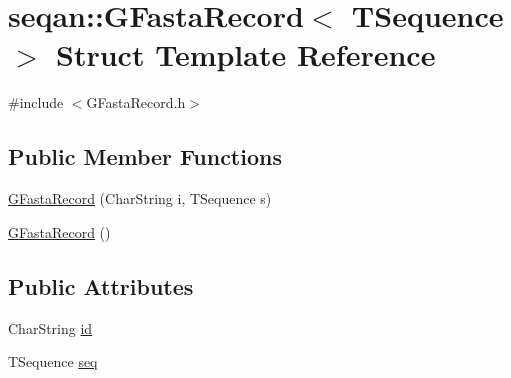 \hypertarget{structseqan_1_1_g_fasta_record}{\section{seqan\-:\-:G\-Fasta\-Record$<$ T\-Sequence $>$ Struct Template Reference}
\label{structseqan_1_1_g_fasta_record}
}


{\ttfamily \#include $<$G\-Fasta\-Record.\-h$>$}

\subsection*{Public Member Functions}
\begin{DoxyCompactItemize}
\item 
\hyperlink{structseqan_1_1_g_fasta_record_aab6a24e2129b61ff86d56bc2b6b9e9a3}{G\-Fasta\-Record} (Char\-String i, T\-Sequence s)
\item 
\hyperlink{structseqan_1_1_g_fasta_record_a605409d17ae67a8bd374d135bc6a3cc4}{G\-Fasta\-Record} ()
\end{DoxyCompactItemize}
\subsection*{Public Attributes}
\begin{DoxyCompactItemize}
\item 
Char\-String \hyperlink{structseqan_1_1_g_fasta_record_a9fc0e5fb39002e38b528f34906899941}{id}
\item 
T\-Sequence \hyperlink{structseqan_1_1_g_fasta_record_a55a6d2deb7ef975f28a4aac89c779702}{seq}
\end{DoxyCompactItemize}


